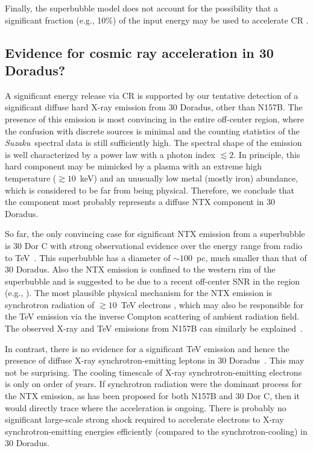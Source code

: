 \documentclass[usenatbib]{mnras}
\def\xs{30 Doradus}
\def\suzaku{{\sl Suzaku}}
\begin{document}
Finally, the superbubble model does not account for the possibility that a significant fraction (e.g., 10\%) of the input energy may be used to accelerate CR \citep{Butt}. 

\subsection{Evidence for cosmic ray acceleration in \xs?}
\label{ss:ntx}

A significant energy release via CR is supported by our tentative detection of a significant diffuse hard X-ray  emission from \xs, other than N157B. The presence of this emission is most convincing in the entire off-center region, where the confusion with discrete sources is minimal and the counting statistics of the \suzaku\ spectral data is still sufficiently high. The spectral shape of the emission is well characterized by a power law with a photon index $\lesssim 2$. In principle, this hard component may be mimicked by a plasma with an extreme high temperature ($\gtrsim 10$~keV) and an unusually low metal (mostly iron) abundance, which is considered to be far from being physical. Therefore, we conclude that the component most probably represents a diffuse NTX component in \xs. 

So far, the only convincing case for significant NTX emission from a superbubble is 30 Dor C with strong observational evidence over the energy range from radio to TeV~\citep{Bamba, Smith2004, HESS2015, Babazaki, Lopez2020}. This superbubble has a diameter of $\sim 100$~pc, much smaller than that of \xs. Also the NTX emission is confined to the western rim of the superbubble and is suggested to be due to a recent 
off-center SNR 
in the region (e.g., \citealt{Chu1990,Wang1991b}). The most plausible physical mechanism for the NTX  emission is synchrotron radiation of $\gtrsim 10$~TeV electrons \citep{Smith2004, Bykov}, which may also be responsible for the TeV emission via the inverse Compton scattering of ambient radiation field. The observed X-ray and TeV emissions from N157B can similarly be explained~\citep{HESS2015}.

In contrast, there is no evidence for a significant TeV emission and hence the presence of diffuse X-ray synchrotron-emitting leptons in \xs~\citep{HESS2015}. This may not be surprising. The cooling timescale of X-ray synchrotron-emitting electrons is only on order of years. If synchrotron radiation were the dominant process for the NTX emission, as has been proposed for both N157B and 30 Dor C, then it would directly trace where the acceleration is ongoing. There is probably no significant large-scale strong shock required to accelerate electrons to X-ray synchrotron-emitting energies efficiently (compared to the synchrotron-cooling) in \xs. 
\end{document}
